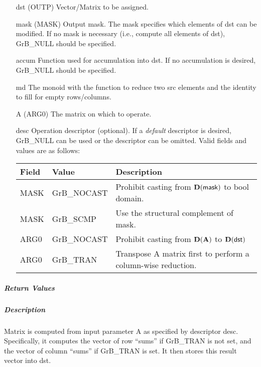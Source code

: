 \begin{itemize}[leftmargin=1.1in]
    \item[{\sf dst}]   ({\sf OUTP}) Vector/Matrix to be assigned.

    \item[{\sf mask}] ({\sf MASK}) Output mask. The mask specifies which elements
    of {\sf dst} can be modified. If no mask is necessary (i.e., compute all
    elements of {\sf dst}), {\sf GrB\_NULL} should be specified.

    \item[{\sf accum}] Function used for accumulation into {\sf dst}.  If no accumulation
                        is desired, {\sf GrB\_NULL} should be specified.

    \item[{\sf md}]    The monoid with the function to reduce two src elements and the identity to fill for empty rows/columns. 
    \item[{\sf A}]     ({\sf ARG0}) The matrix on which to operate.

    \item[{\sf desc}]   Operation descriptor (optional). If a
    \emph{default} descriptor is desired, {\sf GrB\_NULL} can be
    used or the descriptor can be omitted.  Valid fields and values are as follows: \\
    \begin{tabular}{lll}
    Field  & Value & Description \\
    \hline
    {\sf MASK} & {\sf GrB\_NOCAST} & Prohibit casting from $\bold{D}({\sf mask})$ to {\sf bool} domain. \\
    {\sf MASK} & {\sf GrB\_SCMP} & Use the structural complement of {\sf mask}. \\
    {\sf ARG0} & {\sf GrB\_NOCAST} & Prohibit casting from $\bold{D}({\bf A})$ to $\bold{D}({\sf dst})$ \\
    {\sf ARG0} & {\sf GrB\_TRAN} & Transpose {\sf A} matrix first to perform a 
    column-wise reduction. \\
    \end{tabular}

\end{itemize}

\subparagraph{Return Values}

\subparagraph{Description}

Matrix  is computed from
input parameter {\sf A} as specified
by descriptor {\sf desc}. Specifically, it computes the vector of row ``sums'' if GrB\_TRAN is not set, and
the vector of column ``sums'' if GrB\_TRAN  is set. It then stores this result vector into {\sf dst}. 

